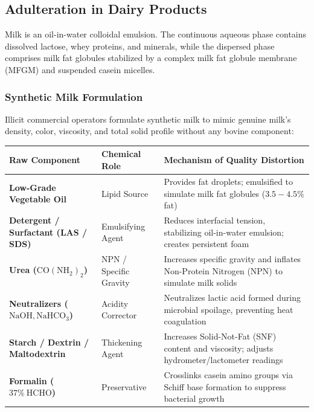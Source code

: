\documentclass[11pt,a4paper,oneside]{article}
\begin{document}
\subsection{Adulteration in Dairy Products}

Milk is an oil-in-water colloidal emulsion. The continuous aqueous phase contains dissolved lactose, whey proteins, and minerals, while the dispersed phase comprises milk fat globules stabilized by a complex milk fat globule membrane (MFGM) and suspended casein micelles.

\subsubsection{Synthetic Milk Formulation}
Illicit commercial operators formulate synthetic milk to mimic genuine milk's density, color, viscosity, and total solid profile without any bovine component:
\begin{center}
\begin{tabular}{@{}p{3.5cm} p{5.5cm} p{7.0cm}@{}}
\toprule
\textbf{Raw Component} & \textbf{Chemical Role} & \textbf{Mechanism of Quality Distortion} \tabularnewline
\midrule
\textbf{Low-Grade Vegetable Oil} & Lipid Source & Provides fat droplets; emulsified to simulate milk fat globules ($3.5-4.5\%$ fat) \tabularnewline
\textbf{Detergent / Surfactant (LAS / SDS)} & Emulsifying Agent & Reduces interfacial tension, stabilizing oil-in-water emulsion; creates persistent foam \tabularnewline
\textbf{Urea ($\mathrm{CO(NH_2)_2}$)} & NPN / Specific Gravity & Increases specific gravity and inflates Non-Protein Nitrogen (NPN) to simulate milk solids \tabularnewline
\textbf{Neutralizers ($\mathrm{NaOH, NaHCO_3}$)} & Acidity Corrector & Neutralizes lactic acid formed during microbial spoilage, preventing heat coagulation \tabularnewline
\textbf{Starch / Dextrin / Maltodextrin} & Thickening Agent & Increases Solid-Not-Fat (SNF) content and viscosity; adjusts hydrometer/lactometer readings \tabularnewline
\textbf{Formalin ($37\%\ \mathrm{HCHO}$)} & Preservative & Crosslinks casein amino groups via Schiff base formation to suppress bacterial growth \tabularnewline
\bottomrule
\end{tabular}
\end{center}
\end{document}
